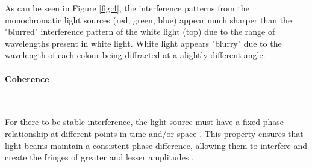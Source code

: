 \documentclass[12pt]{article}
\begin{document}
As can be seen in Figure \ref{fig:4}, the interference patterns from the monochromatic light sources (red, green, blue) appear much sharper than the "blurred" interference pattern of the white light (top)
due to the range of wavelengths present in white light. White light appears "blurry" due to the wavelength of each colour being diffracted at a alightly different angle.

\paragraph{Coherence} \label{sec:1.3.1.2} \leavevmode\\
\vspace{-3ex}

For there to be stable interference, the light source must have a fixed phase relationship at different points in time and/or space \cite{wolf2007introduction}.
This property ensures that light beams maintain a consistent phase difference, allowing them to interfere and create the fringes of greater and lesser amplitudes
\cite{Born_Wolf_Bhatia_Clemmow_Gabor_Stokes_Taylor_Wayman_Wilcock_1999}.
\end{document}
